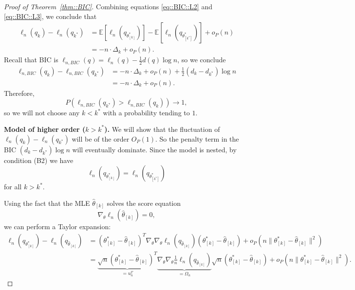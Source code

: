 \documentclass[aos, preprint]{imsart}
\theoremstyle{plain}
\theoremstyle{definition}
\let\hat\widehat
\newcommand{\E}{\mbox{$\mathbb{E}$}}
\begin{document}
\begin{appendix}
\begin{proof}[Proof of Theorem~\ref{thm::BIC}]
Combining equations \eqref{eq::BIC::L2} and \eqref{eq::BIC::L3}, 
we conclude that 
\begin{align*}
\ell_n(q_k) - \ell_n(q_{k^*})  
& = \E\left[ \ell_{n}(q_{\theta^*_{[k]}})\right] - \E\left[ \ell_{n}(q_{\theta^*_{[k^*]}})\right] + o_P\left(n\right)\\
& = -n \cdot \Delta_k + o_P(n).
\end{align*}
Recall that BIC is $\ell_{n ,BIC}(q) = \ell_n(q) - \frac{1}{2} d(q) \log n$, so 
we conclude
\begin{align*}
\ell_{n, BIC}(q_k) - \ell_{n, BIC}(q_{k^*})  
& = -n \cdot \Delta_k + o_P(n) + \frac{1}{2} (d_k -d_{k^*} ) \log n \\
& = -n \cdot \Delta_k + o_P(n).
\end{align*}
Therefore, 
$$
P(\ell_{n, BIC}(q_{k^*}) >\ell_{n, BIC}(q_k)) \rightarrow 1,
$$
so we will not choose any $k<k^*$ with a probability tending to $1$. 

{\bf Model of higher order ($k>k^*$).}
We will show that the fluctuation of $\ell_n(q_k) - \ell_n(q_{k^*})$ 
will be of the order $O_P(1)$.
So the penalty term in the BIC $(d_k - d_{k^*})\log n$ will eventually dominate. 
Since the model is nested, by condition (B2) we have 
\begin{equation}
 \ell_n( q_{\theta^*_{[k]}}) =  \ell_n( q_{\theta^*_{[k^*]}})
 \label{eq::BIC::U1}
\end{equation}
for all $k>k^*$.

Using the fact that the MLE $\hat \theta_{[k]}$
solves the score equation 
$$
\nabla_\theta\ell_n(\hat \theta_{[k]}) = 0, 
$$
we can perform a Taylor expansion:
\begin{align*}
\ell_n(q_{ \theta^*_{[k]}}) - \ell_n(q_{\hat \theta_{[k]}}) 
& = (\theta^*_{[k]} - \hat \theta_{[k]})^T \nabla_\theta\nabla_\theta \ell_n(q_{\hat \theta_{[k]}}) (\theta^*_{[k]} - \hat \theta_{[k]})  +o_P(n \|\theta^*_{[k]} - \hat \theta_{[k]}\|^2)\\
& = \underbrace{\sqrt{n} (\theta^*_{[k]} - \hat \theta_{[k]})^T}_{=u_n^T} \underbrace{\nabla_\theta\nabla_\theta \frac{1}{n}\ell_n(q_{\hat \theta_{[k]}})}_{=\Omega_n} \sqrt{n}(\theta^*_{[k]} - \hat \theta_{[k]}) +o_P(n \|\theta^*_{[k]} - \hat \theta_{[k]}\|^2).
\end{align*}


\end{proof}
\end{appendix}
\end{document}
